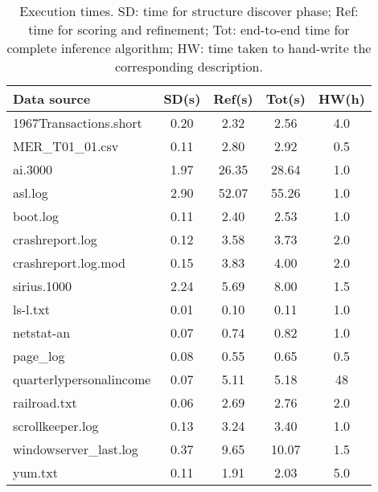 
\begin{table}
\begin{center}
\begin{tabular}{|l||c|c|c|c|} \hline
Data source			& SD(s)     & Ref(s) 	& Tot(s)  & HW(h)\\ \hline \hline
1967Transactions.short          & 0.20&      2.32&      2.56 	& 4.0 	 \\ \hline
MER\_T01\_01.csv                & 0.11&      2.80&      2.92 	& 0.5 	 \\ \hline
ai.3000                         & 1.97&      26.35&     28.64	& 1.0 	 \\ \hline
asl.log                         & 2.90&      52.07&     55.26	& 1.0 	 \\ \hline
boot.log                        & 0.11&      2.40&      2.53 	& 1.0 	 \\ \hline
crashreport.log                 & 0.12&      3.58&      3.73 	& 2.0 	 \\ \hline
crashreport.log.mod             & 0.15&      3.83&      4.00 	& 2.0 	 \\ \hline
sirius.1000                     & 2.24&      5.69&      8.00 	& 1.5 	 \\ \hline
ls-l.txt                        & 0.01&      0.10&      0.11 	& 1.0 	 \\ \hline
netstat-an                      & 0.07&      0.74&      0.82 	& 1.0 	 \\ \hline
page\_log                       & 0.08&      0.55&      0.65 	& 0.5 	 \\ \hline
quarterlypersonalincome         & 0.07&      5.11&      5.18 	& 48  	 \\ \hline
railroad.txt                    & 0.06&      2.69&      2.76 	& 2.0 	 \\ \hline
scrollkeeper.log                & 0.13&      3.24&      3.40 	& 1.0 	 \\ \hline
windowserver\_last.log          & 0.37&      9.65&      10.07	& 1.5 	 \\ \hline
yum.txt                         & 0.11&      1.91&      2.03 	& 5.0 	 \\ \hline
\end{tabular}
\caption{Execution times. SD: time for structure discover phase; Ref: time for scoring and 
refinement; Tot: end-to-end time for complete inference algorithm; HW: 
time taken to hand-write the corresponding description.} \shrink
\label{tab:times}
\end{center}
\end{table}


